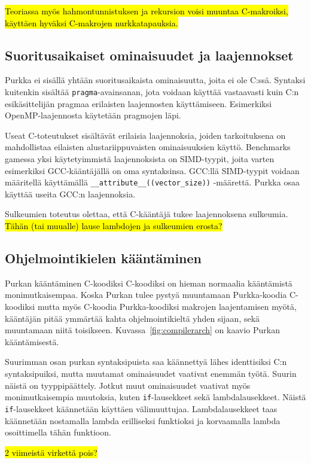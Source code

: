 \hl{Teoriassa myös hahmontunnistuksen ja rekursion voisi muuntaa C-makroiksi,
käyttäen hyväksi C-makrojen nurkkatapauksia.}

\subsection{Suoritusaikaiset ominaisuudet ja laajennokset}

Purkka ei sisällä yhtään suoritusaikaista ominaisuutta, joita ei ole C:ssä.
Syntaksi kuitenkin sisältää \texttt{pragma}-avainsanan, jota voidaan käyttää
vastaavasti kuin C:n esikäsittelijän pragmaa erilaisten laajennosten
käyttämiseen. Esimerkiksi OpenMP-laajennosta käytetään pragmojen läpi.

Useat C-toteutukset sisältävät erilaisia laajennoksia, joiden tarkoituksena on
mahdollistaa eilaisten alustariippuvaisten ominaisuuksien käyttö. Benchmarks
gamessa yksi käytetyimmistä laajennoksista on SIMD-tyypit, joita varten
esimerkiksi GCC-kääntäjällä on oma syntaksinsa. GCC:llä SIMD-tyypit voidaan
määritellä käyttämällä \texttt{\_\_attribute\_\_((vector\_size))} -määrettä.
Purkka osaa käyttää useita GCC:n laajennoksia.

Sulkeumien toteutus olettaa, että C-kääntäjä tukee laajennoksena sulkeumia.
\hl{Tähän (tai muualle) lause lambdojen ja sulkeumien erosta?}

\subsection{Ohjelmointikielen kääntäminen}

Purkan kääntäminen C-koodiksi C-koodiksi on hieman normaalia kääntämistä
monimutkaisempaa. Koska Purkan tulee pystyä muuntamaan Purkka-koodia C-koodiksi
mutta myös C-koodia Purkka-koodiksi makrojen laajentamisen myötä, kääntäjän
pitää ymmärtää kahta ohjelmointikieltä yhden sijaan, sekä muuntamaan niitä
toisikseen. Kuvassa~\ref{fig:compilerarch} on kaavio Purkan kääntämisestä.

Suurimman osan purkan syntaksipuista saa käännettyä lähes identtisiksi C:n
syntaksipuiksi, mutta muutamat ominaisuudet vaativat enemmän työtä. Suurin
näistä on tyyppipäättely. Jotkut muut ominaisuudet vaativat myös
monimutkaisempia muutoksia, kuten \texttt{if}-lausekkeet sekä lambdalausekkeet.
Näistä \texttt{if}-lausekkeet käännetään käyttäen välimuuttujaa.
Lambdalausekkeet taas käännetään nostamalla lambda erilliseksi funktioksi ja
korvaamalla lambda osoittimella tähän funktioon.

\hl{2 viimeistä virkettä pois?}
